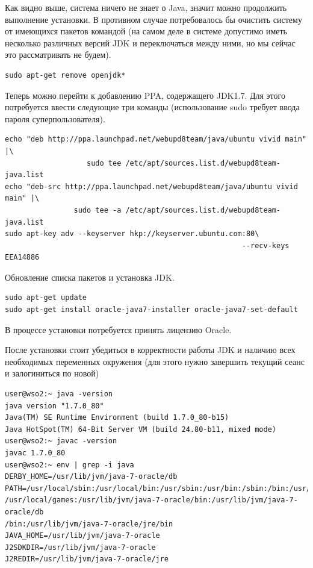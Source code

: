 \documentclass[a4paper, 12pt]{article}		%
\begin{document}
Как видно выше, система ничего не знает о Java, значит можно продолжить выполнение установки. В противном случае потребовалось бы очистить систему от имеющихся пакетов командой (на самом деле в системе допустимо иметь несколько различных версий JDK и переключаться между ними, но мы сейчас это рассматривать не будем).
\begin{Verbatim}[frame=single]
sudo apt-get remove openjdk*
\end{Verbatim}

Теперь можно перейти к добавлению PPA, содержащего JDK1.7. Для этого потребуется ввести следующие три команды (использование sudo требует ввода пароля суперпользователя).
\begin{Verbatim}[frame=single]
echo "deb http://ppa.launchpad.net/webupd8team/java/ubuntu vivid main" |\
                   sudo tee /etc/apt/sources.list.d/webupd8team-java.list
echo "deb-src http://ppa.launchpad.net/webupd8team/java/ubuntu vivid main" |\
                sudo tee -a /etc/apt/sources.list.d/webupd8team-java.list
sudo apt-key adv --keyserver hkp://keyserver.ubuntu.com:80\
                                                       --recv-keys EEA14886
\end{Verbatim}

Обновление списка пакетов и установка JDK.

\begin{Verbatim}[frame=single]
sudo apt-get update
sudo apt-get install oracle-java7-installer oracle-java7-set-default
\end{Verbatim}

В процессе установки потребуется принять лицензию Oracle.

После установки стоит убедиться в корректности работы JDK и наличию всех необходимых переменных окружения (для этого нужно завершить текущий сеанс и залогиниться по новой)

\begin{Verbatim}[frame=single]
user@wso2:~ java -version
java version "1.7.0_80"
Java(TM) SE Runtime Environment (build 1.7.0_80-b15)
Java HotSpot(TM) 64-Bit Server VM (build 24.80-b11, mixed mode)
user@wso2:~ javac -version
javac 1.7.0_80
user@wso2:~ env | grep -i java
DERBY_HOME=/usr/lib/jvm/java-7-oracle/db
PATH=/usr/local/sbin:/usr/local/bin:/usr/sbin:/usr/bin:/sbin:/bin:/usr/games:
/usr/local/games:/usr/lib/jvm/java-7-oracle/bin:/usr/lib/jvm/java-7-oracle/db
/bin:/usr/lib/jvm/java-7-oracle/jre/bin
JAVA_HOME=/usr/lib/jvm/java-7-oracle
J2SDKDIR=/usr/lib/jvm/java-7-oracle
J2REDIR=/usr/lib/jvm/java-7-oracle/jre
\end{Verbatim}
\end{document}
